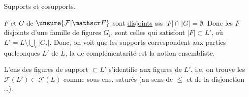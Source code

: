 Supports et cosupports.

$F$ et $G$ de $\unsure{\mathcal F|\mathscr F}$ sont \uline{disjoints}  sss $\lvert F\rvert\cap\lvert G\rvert=\emptyset$. Donc les $F$ disjoints d'une famille de figures $G_i$, sont celles qui  satisfont $\lvert F\rvert\subset L'$, où $L'=L\setminus\bigcup_i\lvert G_i\rvert$. Donc, on voit que les supports correspondent aux parties quelconques $L'$ de $L$, la  de complémentarité est la notion ensembliste.

 L'ens des figures  de support $\subset L'$  s'identifie aux figures de $L'$, i.e. on trouve les $\mathcal F(L')\subset\mathcal F(L)$ comme sous-ens. saturés (au sens de $\leq$ et de la disjonction \ldots).
